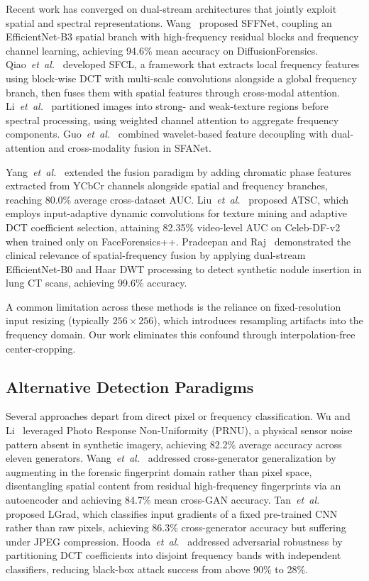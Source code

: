 \documentclass[conference]{IEEEtran}
\begin{document}
Recent work has converged on dual-stream architectures that jointly exploit spatial and spectral representations. Wang~\cite{wang2025sffnet} proposed SFFNet, coupling an EfficientNet-B3 spatial branch with high-frequency residual blocks and frequency channel learning, achieving 94.6\% mean accuracy on DiffusionForensics. Qiao~\emph{et~al.}~\cite{qiao2025sfcl} developed SFCL, a framework that extracts local frequency features using block-wise DCT with multi-scale convolutions alongside a global frequency branch, then fuses them with spatial features through cross-modal attention. Li~\emph{et~al.}~\cite{li2025csfd} partitioned images into strong- and weak-texture regions before spectral processing, using weighted channel attention to aggregate frequency components. Guo~\emph{et~al.}~\cite{guo2025sfanet} combined wavelet-based feature decoupling with dual-attention and cross-modality fusion in SFANet.

Yang~\emph{et~al.}~\cite{yang2025multicue} extended the fusion paradigm by adding chromatic phase features extracted from YCbCr channels alongside spatial and frequency branches, reaching 80.0\% average cross-dataset AUC. Liu~\emph{et~al.}~\cite{liu2024atsc} proposed ATSC, which employs input-adaptive dynamic convolutions for texture mining and adaptive DCT coefficient selection, attaining 82.35\% video-level AUC on Celeb-DF-v2 when trained only on FaceForensics++. Pradeepan and Raj~\cite{pradeepan2024medical} demonstrated the clinical relevance of spatial-frequency fusion by applying dual-stream EfficientNet-B0 and Haar DWT processing to detect synthetic nodule insertion in lung CT scans, achieving 99.6\% accuracy.

A common limitation across these methods is the reliance on fixed-resolution input resizing (typically $256{\times}256$), which introduces resampling artifacts into the frequency domain. Our work eliminates this confound through interpolation-free center-cropping.

\subsection{Alternative Detection Paradigms}

Several approaches depart from direct pixel or frequency classification. Wu and Li~\cite{wu2024prnu} leveraged Photo Response Non-Uniformity (PRNU), a physical sensor noise pattern absent in synthetic imagery, achieving 82.2\% average accuracy across eleven generators. Wang~\emph{et~al.}~\cite{wang2023fingerprint} addressed cross-generator generalization by augmenting in the forensic fingerprint domain rather than pixel space, disentangling spatial content from residual high-frequency fingerprints via an autoencoder and achieving 84.7\% mean cross-GAN accuracy. Tan~\emph{et~al.}~\cite{tan2023lgrad} proposed LGrad, which classifies input gradients of a fixed pre-trained CNN rather than raw pixels, achieving 86.3\% cross-generator accuracy but suffering under JPEG compression. Hooda~\emph{et~al.}~\cite{hooda2024d4} addressed adversarial robustness by partitioning DCT coefficients into disjoint frequency bands with independent classifiers, reducing black-box attack success from above 90\% to 28\%.
\end{document}
